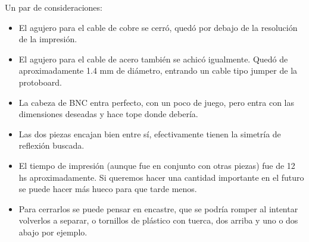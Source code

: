 Un par de consideraciones:  
\begin{itemize}
	\item El agujero para el cable de cobre se cerró, quedó por debajo de la resolución de la impresión.
	\item El agujero para el cable de acero también se achicó igualmente. Quedó de aproximadamente 1.4 mm de diámetro, entrando un cable tipo jumper de la protoboard.
	\item La cabeza de BNC entra perfecto, con un poco de juego, pero entra con las dimensiones deseadas y hace tope donde debería.
	\item Las dos piezas encajan bien entre sí, efectivamente tienen la simetría de reflexión buscada.
	\item El tiempo de impresión (aunque fue en conjunto con otras piezas) fue de 12 hs aproximadamente. Si queremos hacer una cantidad importante en el futuro se puede hacer más hueco para que tarde menos. 
	\item Para cerrarlos se puede pensar en encastre, que se podría romper al intentar volverlos a separar, o tornillos de plástico con tuerca, dos arriba y uno o dos abajo por ejemplo.
\end{itemize}